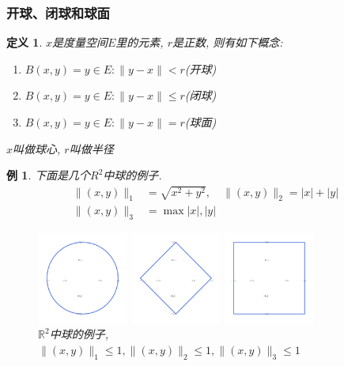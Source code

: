 \documentclass[a4paper,11pt]{book}
\newtheorem{definition}{\hspace{2em}定义}[section]
\newtheorem{example}{例}[section]
\begin{document}
\subsubsection*{开球、闭球和球面}
\begin{definition}
  $x$是度量空间$E$里的元素, $r$是正数, 则有如下概念:
  \begin{enumerate}
    \item $B(x,y)={y\in E:\|y-x\|<r}$(开球)
    \item $B(x,y)={y\in E:\|y-x\|\leq r}$(闭球)
    \item $B(x,y)={y\in E:\|y-x\|=r}$(球面)
  \end{enumerate}
  $x$叫做球心, $r$叫做半径
\end{definition}
\begin{example}
  下面是几个$R^2$中球的例子.
  \begin{equation*}
    \begin{split}
       \|(x,y)\|_1 & =\sqrt{x^2+y^2},\quad\|(x,y)\|_2=|x|+|y| \\
       \|(x,y)\|_3 & =\max{|x|,|y|}
    \end{split}
  \end{equation*}
\begin{figure}[H]
  \centering
  \begin{minipage}{3cm}
    \includegraphics[width=3cm]{fig1.pdf}
  \end{minipage}
  \begin{minipage}{3cm}
    \includegraphics[width=3cm]{fig2.pdf}
  \end{minipage}
  \begin{minipage}{3cm}
    \includegraphics[width=3cm]{fig3.pdf}
  \end{minipage}
  \caption{$\mathbb{R}^2$中球的例子, $\|(x,y)\|_1\leq1, \|(x,y)\|_2\leq1, \|(x,y)\|_3\leq1$}
\end{figure}
\end{example}
\end{document}
